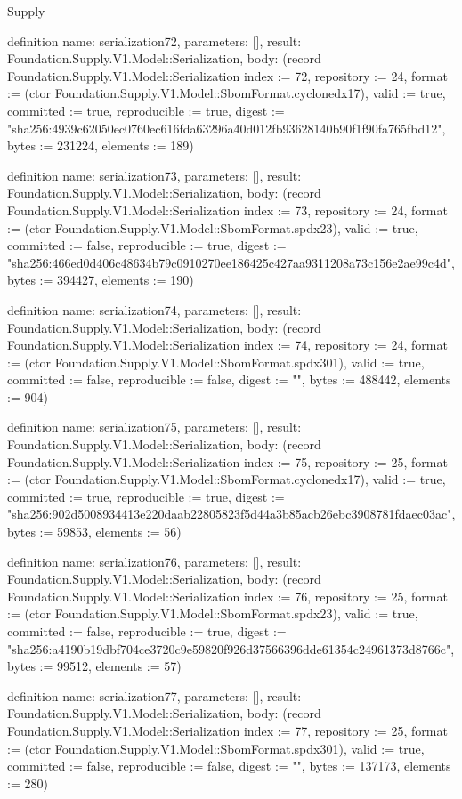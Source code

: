 \begin{lexlean}{Supply}
\begin{semanticmodule}
definition{
  name: serialization72,
  parameters: [],
  result: Foundation.Supply.V1.Model::Serialization,
  body: (record Foundation.Supply.V1.Model::Serialization {index := 72, repository := 24, format := (ctor Foundation.Supply.V1.Model::SbomFormat.cyclonedx17), valid := true, committed := true, reproducible := true, digest := "sha256:4939c62050ec0760ec616fda63296a40d012fb93628140b90f1f90fa765fbd12", bytes := 231224, elements := 189})
}

definition{
  name: serialization73,
  parameters: [],
  result: Foundation.Supply.V1.Model::Serialization,
  body: (record Foundation.Supply.V1.Model::Serialization {index := 73, repository := 24, format := (ctor Foundation.Supply.V1.Model::SbomFormat.spdx23), valid := true, committed := false, reproducible := true, digest := "sha256:466ed0d406c48634b79c0910270ee186425c427aa9311208a73c156e2ae99c4d", bytes := 394427, elements := 190})
}

definition{
  name: serialization74,
  parameters: [],
  result: Foundation.Supply.V1.Model::Serialization,
  body: (record Foundation.Supply.V1.Model::Serialization {index := 74, repository := 24, format := (ctor Foundation.Supply.V1.Model::SbomFormat.spdx301), valid := true, committed := false, reproducible := false, digest := "", bytes := 488442, elements := 904})
}

definition{
  name: serialization75,
  parameters: [],
  result: Foundation.Supply.V1.Model::Serialization,
  body: (record Foundation.Supply.V1.Model::Serialization {index := 75, repository := 25, format := (ctor Foundation.Supply.V1.Model::SbomFormat.cyclonedx17), valid := true, committed := true, reproducible := true, digest := "sha256:902d5008934413e220daab22805823f5d44a3b85acb26ebc3908781fdaec03ac", bytes := 59853, elements := 56})
}

definition{
  name: serialization76,
  parameters: [],
  result: Foundation.Supply.V1.Model::Serialization,
  body: (record Foundation.Supply.V1.Model::Serialization {index := 76, repository := 25, format := (ctor Foundation.Supply.V1.Model::SbomFormat.spdx23), valid := true, committed := false, reproducible := true, digest := "sha256:a4190b19dbf704ce3720c9e59820f926d37566396dde61354c24961373d8766c", bytes := 99512, elements := 57})
}

definition{
  name: serialization77,
  parameters: [],
  result: Foundation.Supply.V1.Model::Serialization,
  body: (record Foundation.Supply.V1.Model::Serialization {index := 77, repository := 25, format := (ctor Foundation.Supply.V1.Model::SbomFormat.spdx301), valid := true, committed := false, reproducible := false, digest := "", bytes := 137173, elements := 280})
}


\end{semanticmodule}
\end{lexlean}
